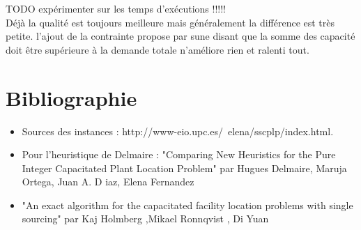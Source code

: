 \documentclass[12pt,a4paper]{article}
\begin{document}
TODO expérimenter sur les temps d’exécutions !!!!!\\
Déjà la qualité est toujours meilleure mais généralement la différence est très petite.
l'ajout de la contrainte propose par sune disant que la somme des capacité doit être supérieure à la demande totale n’améliore rien et ralenti tout.

\section*{Bibliographie}

\begin{itemize}
\item
Sources des instances : http://www-eio.upc.es/~elena/sscplp/index.html.\\
\item
Pour l'heuristique de Delmaire : "Comparing New Heuristics for the Pure Integer Capacitated Plant Location Problem" par Hugues Delmaire, Maruja Ortega, Juan A. D iaz, Elena Fernandez 
\item
"An exact algorithm for the capacitated facility location problems with single sourcing" par Kaj Holmberg ,Mikael Ronnqvist , Di Yuan
\end{itemize}
\end{document}
